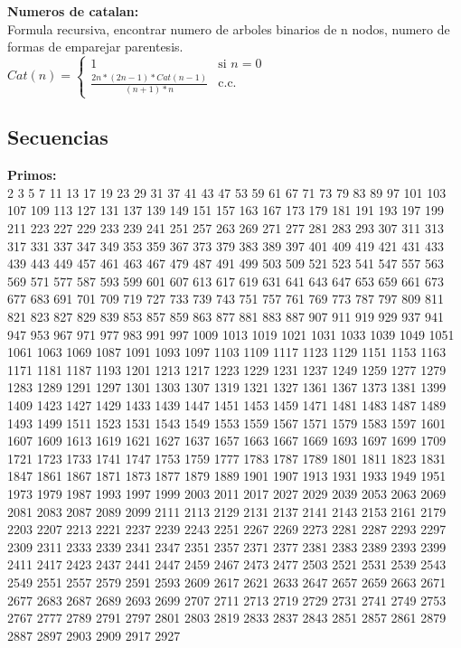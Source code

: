 \documentclass[10pt,landscape,twocolumn,a4paper,notitlepage]{article}
\begin{document}
			\vspace{8mm}
			\textbf{Numeros de catalan:}\\
			Formula recursiva, encontrar numero de arboles binarios de n nodos, numero de formas de
			emparejar parentesis.\\
			$Cat(n) = 	
			\begin{cases}
				1 & \text{si $n = 0$}\\
				\frac{2n*(2n-1) * Cat(n-1)}{(n+1)*n} & \text{c.c.}
			\end{cases}
			$\\
			
		\subsection{Secuencias}
		
		\textbf{Primos:}\\
		\vspace{3mm}
			2 3 5 7 11 13 17 19 23 29 31 37 41 43 47 53 59 61 67 71 73 79 83 89 97 101 103 107 109 113 127 131 137 139 149
			151 157 163 167 173 179 181 191 193 197 199 211 223 227 229 233 239 241 251 257 263 269 271 277 281 283 293 307
			311 313 317 331 337 347 349 353 359 367 373 379 383 389 397 401 409 419 421 431 433 439 443 449 457 461 463 467
			479 487 491 499 503 509 521 523 541 547 557 563 569 571 577 587 593 599 601 607 613 617 619 631 641 643 647 653
			659 661 673 677 683 691 701 709 719 727 733 739 743 751 757 761 769 773 787 797 809 811 821 823 827 829 839 853
			857 859 863 877 881 883 887 907 911 919 929 937 941 947 953 967 971 977 983 991 997 1009 1013 1019 1021 1031
			1033 1039 1049 1051 1061 1063 1069 1087 1091 1093 1097 1103 1109 1117 1123 1129 1151 1153 1163 1171 1181 1187
			1193 1201 1213 1217 1223 1229 1231 1237 1249 1259 1277 1279 1283 1289 1291 1297 1301 1303 1307 1319 1321 1327
			1361 1367 1373 1381 1399 1409 1423 1427 1429 1433 1439 1447 1451 1453 1459 1471 1481 1483 1487 1489 1493 1499
			1511 1523 1531 1543 1549 1553 1559 1567 1571 1579 1583 1597 1601 1607 1609 1613 1619 1621 1627 1637 1657 1663
			1667 1669 1693 1697 1699 1709 1721 1723 1733 1741 1747 1753 1759 1777 1783 1787 1789 1801 1811 1823 1831 1847
			1861 1867 1871 1873 1877 1879 1889 1901 1907 1913 1931 1933 1949 1951 1973 1979 1987 1993 1997 1999 2003 2011
			2017 2027 2029 2039 2053 2063 2069 2081 2083 2087 2089 2099 2111 2113 2129 2131 2137 2141 2143 2153 2161 2179
			2203 2207 2213 2221 2237 2239 2243 2251 2267 2269 2273 2281 2287 2293 2297 2309 2311 2333 2339 2341 2347 2351
			2357 2371 2377 2381 2383 2389 2393 2399 2411 2417 2423 2437 2441 2447 2459 2467 2473 2477 2503 2521 2531 2539
			2543 2549 2551 2557 2579 2591 2593 2609 2617 2621 2633 2647 2657 2659 2663 2671 2677 2683 2687 2689 2693 2699
			2707 2711 2713 2719 2729 2731 2741 2749 2753 2767 2777 2789 2791 2797 2801 2803 2819 2833 2837 2843 2851 2857
			2861 2879 2887 2897 2903 2909 2917 2927
	
\end{document}
